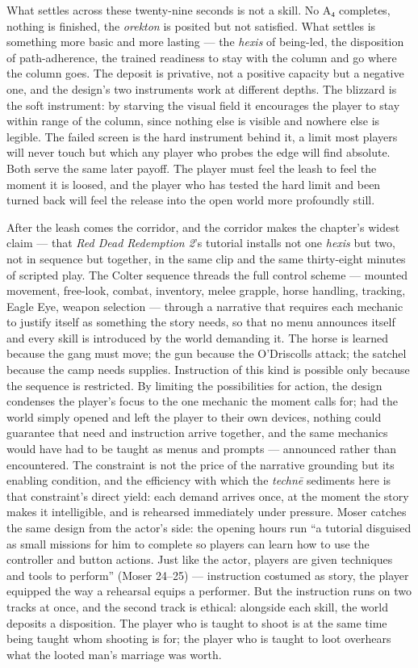 What settles across these twenty-nine seconds is not a skill. No A₄ completes, nothing is finished, the \textit{orekton} is posited but not satisfied. What settles is something more basic and more lasting — the \textit{hexis} of being-led, the disposition of path-adherence, the trained readiness to stay with the column and go where the column goes. The deposit is privative, not a positive capacity but a negative one, and the design's two instruments work at different depths. The blizzard is the soft instrument: by starving the visual field it encourages the player to stay within range of the column, since nothing else is visible and nowhere else is legible. The failed screen is the hard instrument behind it, a limit most players will never touch but which any player who probes the edge will find absolute. Both serve the same later payoff. The player must feel the leash to feel the moment it is loosed, and the player who has tested the hard limit and been turned back will feel the release into the open world more profoundly still.

After the leash comes the corridor, and the corridor makes the chapter's widest claim — that \textit{Red Dead Redemption 2}'s tutorial installs not one \textit{hexis} but two, not in sequence but together, in the same clip and the same thirty-eight minutes of scripted play. The Colter sequence threads the full control scheme — mounted movement, free-look, combat, inventory, melee grapple, horse handling, tracking, Eagle Eye, weapon selection — through a narrative that requires each mechanic to justify itself as something the story needs, so that no menu announces itself and every skill is introduced by the world demanding it. The horse is learned because the gang must move; the gun because the O'Driscolls attack; the satchel because the camp needs supplies. Instruction of this kind is possible only because the sequence is restricted. By limiting the possibilities for action, the design condenses the player's focus to the one mechanic the moment calls for; had the world simply opened and left the player to their own devices, nothing could guarantee that need and instruction arrive together, and the same mechanics would have had to be taught as menus and prompts — announced rather than encountered. The constraint is not the price of the narrative grounding but its enabling condition, and the efficiency with which the \textit{technē} sediments here is that constraint's direct yield: each demand arrives once, at the moment the story makes it intelligible, and is rehearsed immediately under pressure.
Moser catches the same design from the actor's side: the opening hours run ``a tutorial disguised as small missions for him to complete so players can learn how to use the controller and button actions. Just like the actor, players are given techniques and tools to perform'' (Moser 24--25) — instruction costumed as story, the player equipped the way a rehearsal equips a performer. But the instruction runs on two tracks at once, and the second track is ethical: alongside each skill, the world deposits a disposition. The player who is taught to shoot is at the same time being taught whom shooting is for; the player who is taught to loot overhears what the looted man's marriage was worth.

